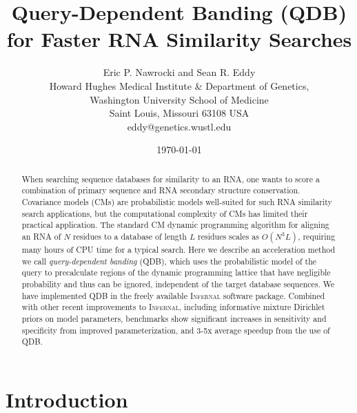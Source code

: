 \documentclass[11pt]{article}
\begin{document}
\title{Query-Dependent Banding (QDB) for Faster RNA Similarity Searches}
\author{Eric P. Nawrocki and Sean R. Eddy\\
Howard Hughes Medical Institute \& Department of Genetics, \\
Washington University School of Medicine \\
Saint Louis, Missouri 63108 USA \\
eddy@genetics.wustl.edu}  
\date{\today}
\maketitle




\begin{abstract}

When searching sequence databases for similarity to an RNA, one wants
to score a combination of primary sequence and RNA secondary structure
conservation.  Covariance models (CMs) are probabilistic models
well-suited for such RNA similarity search applications, but the
computational complexity of CMs has limited their practical
application. The standard CM dynamic programming algorithm for
aligning an RNA of $N$ residues to a database of length $L$ residues
scales as $O(N^3 L)$, requiring many hours of CPU time for a typical
search. Here we describe an acceleration method we call
\emph{query-dependent banding} (QDB), which uses the probabilistic
model of the query to precalculate regions of the dynamic programming
lattice that have negligible probability and thus can be ignored,
independent of the target database sequences. We have implemented QDB
in the freely available \textsc{Infernal} software package. Combined
with other recent improvements to \textsc{Infernal}, including
informative mixture Dirichlet priors on model parameters, benchmarks
show significant increases in sensitivity and specificity from
improved parameterization, and 3-5x average speedup from the use of
QDB.

\end{abstract}





\section{Introduction}
\end{document}
